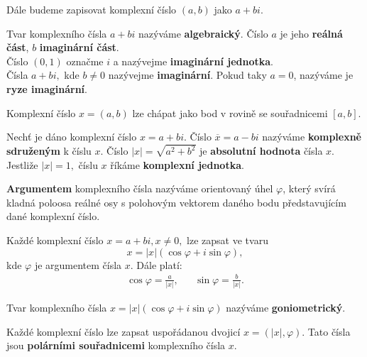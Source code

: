 \begin{pozn}
    Dále budeme zapisovat komplexní číslo $(a,b)$ jako $a+bi.$
\end{pozn}

\begin{definition}
    Tvar komplexního čísla $a+bi$ nazýváme \textbf{algebraický}. Číslo $a$ je jeho
   \textbf{reálná část}, $b$ \textbf{imaginární část}.\\
  Číslo $(0,1)$ označme $i$ a nazývejme \textbf{imaginární jednotka}. \\
  Čísla $a+bi,$ kde $b\ne 0$ nazývejme \textbf{imaginární}. Pokud taky $a=0$,
  nazýváme je \textbf{ryze imaginární}.
\end{definition}

\begin{pozn}
    Komplexní číslo $x=(a,b)$ lze chápat jako bod v rovině se souřadnicemi $[a,b].$
\end{pozn}

\begin{definition}
    Nechť je dáno komplexní číslo $x= a+bi.$ Číslo $\overline{x}=a-bi$ nazýváme
   \textbf{komplexně sdruženým} k číslu $x$. Číslo $|x|=\sqrt{a^2+b^2}$ je \textbf{
   absolutní hodnota} čísla $x$. Jestliže $|x|=1,$ číslu $x$ říkáme \textbf{komplexní jednotka}.
\end{definition}

\begin{definition}
\textbf{Argumentem} komplexního čísla nazýváme orientovaný úhel $\varphi$, který svírá kladná
poloosa reálné osy s polohovým vektorem daného bodu představujícím dané komplexní číslo.
\end{definition}

\begin{veta}
    Každé komplexní číslo $x=a+bi, x\ne 0,$ lze zapsat ve tvaru
    $$x=|x|(\cos \varphi + i \sin \varphi),$$
    kde $\varphi$ je argumentem čísla $x$. Dále platí:
    \begin{align*}
        \cos \varphi = \frac{a}{|x|}, && \sin \varphi = \frac{b}{|x|}.
    \end{align*}
\end{veta}

\begin{definition}
    Tvar komplexního čísla $x= |x|(\cos \varphi + i\sin\varphi)$ nazýváme \textbf{goniometrický}.
\end{definition}

\begin{pozn}
    Každé komplexní číslo lze zapsat uspořádanou dvojicí $x=(|x|, \varphi).$
    Tato čísla jsou \textbf{polárními souřadnicemi} komplexního čísla $x$.
\end{pozn}

